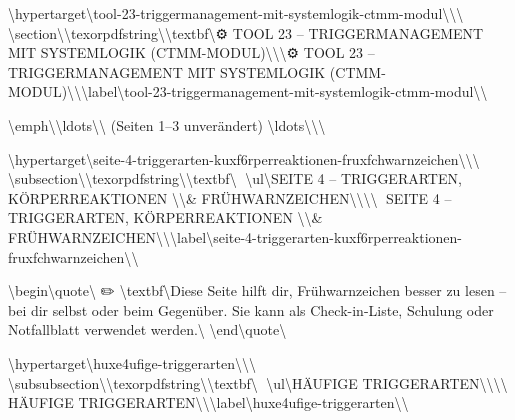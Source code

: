 \textbackslash{}hypertarget\textbackslash{}{tool-23-triggermanagement-mit-systemlogik-ctmm-modul\textbackslash{}}\textbackslash{}{\textbackslash{}%
\textbackslash{}section\textbackslash{}{\textbackslash{}texorpdfstring\textbackslash{}{\textbackslash{}textbf\textbackslash{}{⚙️ TOOL 23 -- TRIGGERMANAGEMENT MIT SYSTEMLOGIK (CTMM-MODUL)\textbackslash{}}\textbackslash{}}\textbackslash{}{⚙️ TOOL 23 -- TRIGGERMANAGEMENT MIT SYSTEMLOGIK (CTMM-MODUL)\textbackslash{}}\textbackslash{}}\textbackslash{}label\textbackslash{}{tool-23-triggermanagement-mit-systemlogik-ctmm-modul\textbackslash{}}\textbackslash{}}

\textbackslash{}emph\textbackslash{}{\textbackslash{}ldots\textbackslash{}{\textbackslash{}} (Seiten 1--3 unverändert) \textbackslash{}ldots\textbackslash{}{\textbackslash{}}\textbackslash{}}

\textbackslash{}hypertarget\textbackslash{}{seite-4-triggerarten-kuxf6rperreaktionen-fruxfchwarnzeichen\textbackslash{}}\textbackslash{}{\textbackslash{}%
\textbackslash{}subsection\textbackslash{}{\textbackslash{}texorpdfstring\textbackslash{}{\textbackslash{}textbf\textbackslash{}{🧠 \textbackslash{}ul\textbackslash{}{SEITE 4 -- TRIGGERARTEN, KÖRPERREAKTIONEN \textbackslash{}\textbackslash{}& FRÜHWARNZEICHEN\textbackslash{}}\textbackslash{}}\textbackslash{}}\textbackslash{}{🧠 SEITE 4 -- TRIGGERARTEN, KÖRPERREAKTIONEN \textbackslash{}\textbackslash{}& FRÜHWARNZEICHEN\textbackslash{}}\textbackslash{}}\textbackslash{}label\textbackslash{}{seite-4-triggerarten-kuxf6rperreaktionen-fruxfchwarnzeichen\textbackslash{}}\textbackslash{}}

\textbackslash{}begin\textbackslash{}{quote\textbackslash{}}
✏️ \textbackslash{}textbf\textbackslash{}{Diese Seite hilft dir, Frühwarnzeichen besser zu lesen -- bei dir selbst oder beim Gegenüber. Sie kann als Check-in-Liste, Schulung oder Notfallblatt verwendet werden.\textbackslash{}}
\textbackslash{}end\textbackslash{}{quote\textbackslash{}}

\textbackslash{}hypertarget\textbackslash{}{huxe4ufige-triggerarten\textbackslash{}}\textbackslash{}{\textbackslash{}%
\textbackslash{}subsubsection\textbackslash{}{\textbackslash{}texorpdfstring\textbackslash{}{\textbackslash{}textbf\textbackslash{}{🚨 \textbackslash{}ul\textbackslash{}{HÄUFIGE TRIGGERARTEN\textbackslash{}}\textbackslash{}}\textbackslash{}}\textbackslash{}{🚨 HÄUFIGE TRIGGERARTEN\textbackslash{}}\textbackslash{}}\textbackslash{}label\textbackslash{}{huxe4ufige-triggerarten\textbackslash{}}\textbackslash{}}

